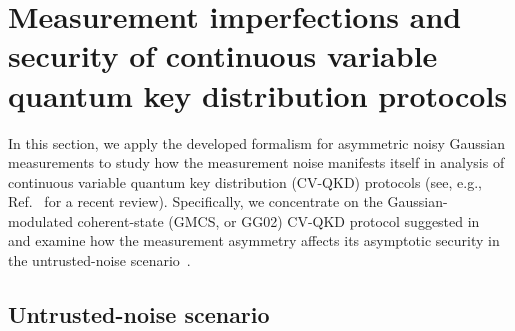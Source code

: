 \documentclass[%
reprint,
superscriptaddress,
 amsmath,amssymb,amsfonts,
 aps,
 pra,
 longbibliography
]{revtex4-2}
\begin{document}

\section{Measurement imperfections and security
of continuous variable quantum key distribution protocols}
\label{sec:protocol}

In this section, we apply the developed formalism for asymmetric noisy
Gaussian measurements to study
how the measurement noise
manifests itself in analysis
of
continuous variable quantum key distribution
(CV-QKD) protocols
(see, e.g., Ref.~\cite{Zhang:apr:2024} for a recent review).
Specifically,
we concentrate on the
Gaussian-modulated coherent-state
(GMCS, or GG02)
CV-QKD protocol suggested in~\cite{PhysRevLett.88.057902}
and examine
how the measurement asymmetry affects its asymptotic security
in the untrusted-noise scenario~\cite{Laudenbach:aqt:2018}.


\subsection{Untrusted-noise scenario}
\label{subsec:untr-noise}
\end{document}
